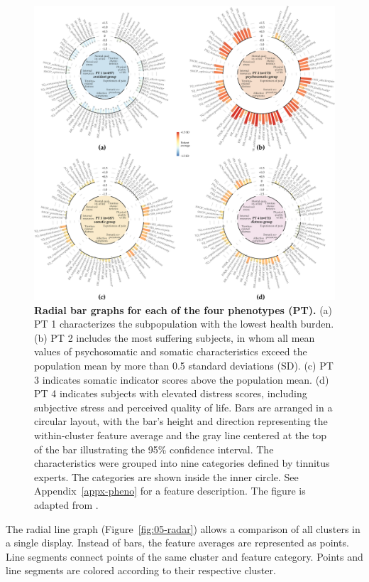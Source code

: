 \documentclass[
  oneside]{book}
\begin{document}
\begin{figure}[htb]

{\centering \includegraphics[width=1\linewidth]{figures/05-all-radial-barcharts-export} 

}

\caption{\textbf{Radial bar graphs for each of the four phenotypes (PT).} (a) PT 1 characterizes the subpopulation with the lowest health burden. (b) PT 2 includes the most suffering subjects, in whom all mean values of psychosomatic and somatic characteristics exceed the population mean by more than 0.5 standard deviations (SD). (c) PT 3 indicates somatic indicator scores above the population mean. (d) PT 4 indicates subjects with elevated distress scores, including subjective stress and perceived quality of life. Bars are arranged in a circular layout, with the bar's height and direction representing the within-cluster feature average and the gray line centered at the top of the bar illustrating the 95\% confidence interval. The characteristics were grouped into nine categories defined by tinnitus experts. The categories are shown inside the inner circle. See Appendix~\ref{appx-pheno} for a feature description. The figure is adapted from \autocite{Niemann:SREP_Pheno2020}.}\label{fig:05-all-radial-barcharts-export}
\end{figure}

The radial line graph (Figure~\ref{fig:05-radar}) allows a comparison of all clusters in a single display.
Instead of bars, the feature averages are represented as points.
Line segments connect points of the same cluster and feature category.
Points and line segments are colored according to their respective cluster.
\end{document}
